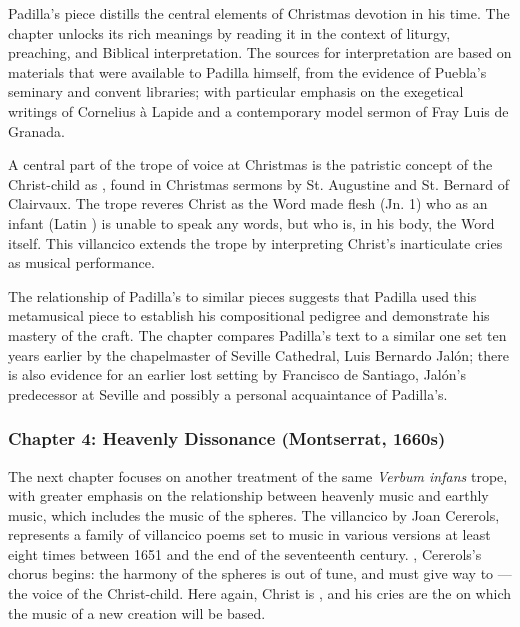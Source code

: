 \documentclass{vcbook-proposal}
\begin{document}
Padilla's piece distills the central elements of Christmas devotion in his time.
The chapter unlocks its rich meanings by reading it in the context of liturgy, 
preaching, and Biblical interpretation.
The sources for interpretation are based on materials that were available to
Padilla himself, from the evidence of Puebla's seminary and convent libraries;
with particular emphasis on the exegetical writings of Cornelius à Lapide and a
contemporary model sermon of Fray Luis de Granada.

A central part of the trope of voice at Christmas is the patristic concept of 
the Christ-child as , found in Christmas sermons by St.
Augustine and St. Bernard of Clairvaux.
The trope reveres Christ as the Word made flesh (Jn. 1) who as an infant (Latin 
) is unable to speak any words, but who is, in his body, the 
Word itself.
This villancico extends the trope by interpreting Christ's inarticulate cries 
as musical performance.

The relationship of Padilla's  to similar 
pieces suggests that Padilla used this metamusical piece to establish his 
compositional pedigree and demonstrate his mastery of the craft.
The chapter compares Padilla's text to a similar one set ten years earlier by
the chapelmaster of Seville Cathedral, Luis Bernardo Jalón; there is also
evidence for an earlier lost setting by Francisco de Santiago, Jalón's
predecessor at Seville and possibly a personal acquaintance of Padilla's.

\subsubsection{Chapter 4: Heavenly Dissonance (Montserrat, 1660s)}

The next chapter focuses on another treatment of the same \emph{Verbum
infans} trope, with greater emphasis on the relationship between heavenly music
and earthly music, which includes the music of the spheres.
The villancico  by Joan Cererols, represents a
family of villancico poems set to music in various versions at least eight times
between 1651 and the end of the seventeenth century.
, Cererols's chorus begins:
the harmony of the spheres is out of tune, and must give 
way to ---the voice of the Christ-child.
Here again, Christ is , and his cries are the
 on which the music of a new creation will be based.
\end{document}
